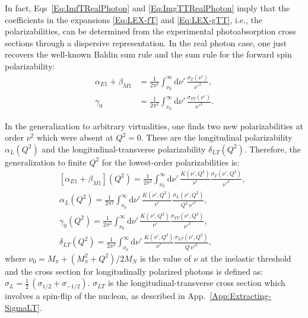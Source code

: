 \documentclass[twocolumn,prc,showpacs,nofootinbib,preprintnumbers,amsmath,amssymb,superscriptaddress]{revtex4-1}
\def\half{\mbox{$\frac{1}{2}$}}
\def\dd{\mathrm{d}}
\begin{document}
In fact, Eqs~\eqref{Eq:ImfTRealPhoton} and \eqref{Eq:ImgTTRealPhoton} imply that the coefficients in the expansions \eqref{Eq:LEX-fT} and \eqref{Eq:LEX-gTT},  i.e., the polarizabilities, can be determined from the experimental photoabsorption cross sections through a dispersive representation.
In the real photon case, one just recovers the well-known Baldin sum rule and the sum rule for the forward spin polarizability:
 \begin{align}
\alpha_{E1}+\beta_{M1}&= \frac{1}{2 \pi^2} \int_{\nu_0}^\infty\!\!\!\! \dd\nu'\, \frac{\sigma_T (\nu')}{\nu'^2},\\
\gamma_0&= \frac{1}{2 \pi^2} \int_{\nu_0}^\infty\!\!\!\! \dd\nu'\, \frac{\sigma_{TT} (\nu')}{\nu'^3}.
\end{align}

In the generalization to arbitrary virtualities, one finds two new polarizabilities at order $\nu^2$ which were absent at $Q^2=0$.
These are the longitudinal polarizability $\alpha_L(Q^2)$ and the longitudinal-transverse polarizability $\delta_{LT}(Q^2)$. 
Therefore, the generalization to finite $Q^2$ for the lowest-order polarizabilities is:
\begin{eqnarray}
&&[\alpha_{E1}+\beta_{M1}] (Q^2)= \frac{1}{2 \pi^2} \int_{\nu_0}^\infty \!\!\!\! \dd\nu'\,\frac{K(\nu',Q^2)}{\nu'} \frac{\sigma_T (\nu',Q^2)}{\nu'^2},\qquad \label{Eq:alpha+betaQ2}\\
&&\alpha_L (Q^2)= \frac{1}{2 \pi^2} \int_{\nu_0}^\infty\!\!\!\! \dd\nu'\, \frac{K(\nu',Q^2)}{\nu'}              \frac{\sigma_L (\nu',Q^2)}{Q^2\, \nu'^2}, \label{Eq:alphaLQ2}\\
&&\gamma_0 (Q^2)= \frac{1}{2 \pi^2} \int_{\nu_0}^\infty \!\!\!\! \dd\nu'\,\frac{K(\nu',Q^2)}{\nu'} \frac{\sigma_{TT} (\nu',Q^2)}{\nu'^3}, \label{Eq:gamma0Q2}\\
&&\delta_{LT} (Q^2)= \frac{1}{2 \pi^2} \int_{\nu_0}^\infty \!\!\!\! \dd\nu'\,\frac{K(\nu',Q^2)}{\nu'} \frac{\sigma_{LT} (\nu',Q^2)}{Q\,\nu'^2}, \label{Eq:deltaLTQ2} 
\end{eqnarray}
where $\nu_0=M_\pi + (M_\pi^2+Q^2)/2M_N$ is the value of $\nu$ at the inelastic threshold and the cross section for longitudinally polarized photons is defined as: $\sigma_L=\half\, (\sigma_{1/2}+\sigma_{-1/2})$. $\sigma_{LT}$ is the longitudinal-transverse cross section which involves a spin-flip of the nucleon, as described in App.~\ref{App:Extracting-SigmaLT}.

\end{document}

